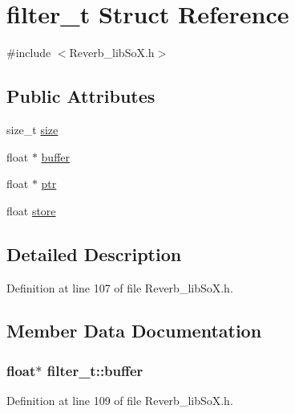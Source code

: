 \hypertarget{structfilter__t}{}\section{filter\+\_\+t Struct Reference}
\label{structfilter__t}


{\ttfamily \#include $<$Reverb\+\_\+lib\+So\+X.\+h$>$}

\subsection*{Public Attributes}
\begin{DoxyCompactItemize}
\item 
size\+\_\+t \hyperlink{structfilter__t_a67a88c7d6a8eb2642661b22e552a45cb}{size}
\item 
float $\ast$ \hyperlink{structfilter__t_a76084278d6e2955b0438bf74143f2a6c}{buffer}
\item 
float $\ast$ \hyperlink{structfilter__t_ae8a9183f8d7e1c4b3af047ec0f256459}{ptr}
\item 
float \hyperlink{structfilter__t_a6c6fadd221d1195296f71720c9fa4d73}{store}
\end{DoxyCompactItemize}


\subsection{Detailed Description}


Definition at line 107 of file Reverb\+\_\+lib\+So\+X.\+h.



\subsection{Member Data Documentation}
\subsubsection[{\texorpdfstring{buffer}{buffer}}]{\setlength{\rightskip}{0pt plus 5cm}float$\ast$ filter\+\_\+t\+::buffer}\hypertarget{structfilter__t_a76084278d6e2955b0438bf74143f2a6c}{}\label{structfilter__t_a76084278d6e2955b0438bf74143f2a6c}


Definition at line 109 of file Reverb\+\_\+lib\+So\+X.\+h.

